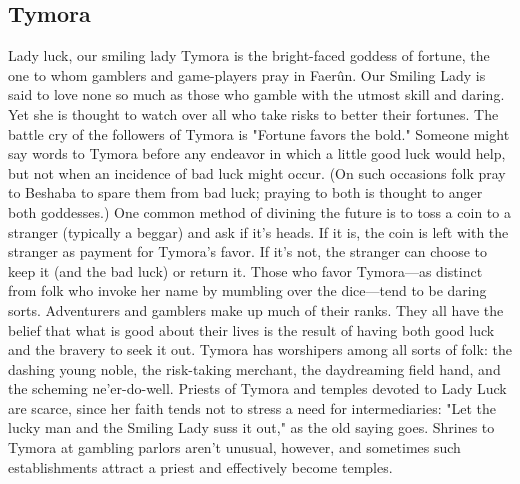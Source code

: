 \documentclass[10pt,a4paper,twoside,twocolumn,openany,bg=print,nodeprecatedcode]{dndbook}
\begin{document}
\subsection{Tymora}
Lady luck, our smiling lady
Tymora is the bright-faced goddess of fortune, the one to whom gamblers and game-players pray in Faerûn. Our Smiling Lady is said to love none so much as those who gamble with the utmost skill and daring. Yet she is thought to watch over all who take risks to better their fortunes.
The battle cry of the followers of Tymora is "Fortune favors the bold." Someone might say words to Tymora before any endeavor in which a little good luck would help, but not when an incidence of bad luck might occur. (On such occasions folk pray to Beshaba to spare them from bad luck; praying to both is thought to anger both goddesses.) One common method of divining the future is to toss a coin to a stranger (typically a beggar) and ask if it's heads. If it is, the coin is left with the stranger as payment for Tymora's favor. If it's not, the stranger can choose to keep it (and the bad luck) or return it.
Those who favor Tymora—as distinct from folk who invoke her name by mumbling over the dice—tend to be daring sorts. Adventurers and gamblers make up much of their ranks. They all have the belief that what is good about their lives is the result of having both good luck and the bravery to seek it out. Tymora has worshipers among all sorts of folk: the dashing young noble, the risk-taking merchant, the daydreaming field hand, and the scheming ne'er-do-well.
Priests of Tymora and temples devoted to Lady Luck are scarce, since her faith tends not to stress a need for intermediaries: "Let the lucky man and the Smiling Lady suss it out," as the old saying goes. Shrines to Tymora at gambling parlors aren't unusual, however, and sometimes such establishments attract a priest and effectively become temples.
\end{document}
